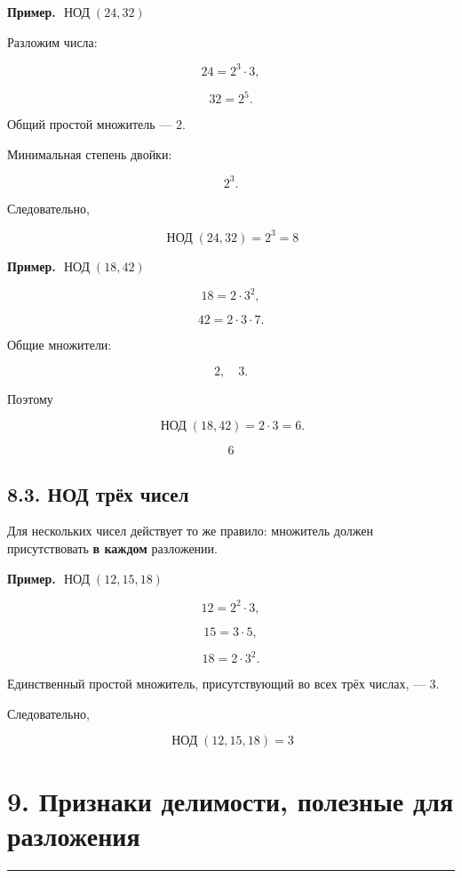 \documentclass[a4paper,12pt]{article}
\newcommand{\sectionline}{%
    \vspace{0.2em}
    {\color{accent}\rule{\linewidth}{0.6pt}}
    \vspace{0.5em}
}
\newcommand{\exampletitle}[1]{%
    \par\medskip
    {\color{accent}\textbf{Пример. #1}}
    \par\smallskip
}
\begin{document}
\exampletitle{\(\operatorname{НОД}(24,32)\)}

Разложим числа:

\[
24=2^3\cdot3,
\]

\[
32=2^5.
\]

Общий простой множитель --- \(2\).

Минимальная степень двойки:

\[
2^3.
\]

Следовательно,

\[
\boxed{
\operatorname{НОД}(24,32)=2^3=8
}
\]

\exampletitle{\(\operatorname{НОД}(18,42)\)}

\[
18=2\cdot3^2,
\]

\[
42=2\cdot3\cdot7.
\]

Общие множители:

\[
2,\quad3.
\]

Поэтому

\[
\operatorname{НОД}(18,42)
=
2\cdot3
=
6.
\]

\[
\boxed{6}
\]

\subsection*{\color{accent}8.3. НОД трёх чисел}

Для нескольких чисел действует то же правило:
множитель должен присутствовать \textbf{в каждом} разложении.

\exampletitle{\(\operatorname{НОД}(12,15,18)\)}

\[
12=2^2\cdot3,
\]

\[
15=3\cdot5,
\]

\[
18=2\cdot3^2.
\]

Единственный простой множитель, присутствующий во всех трёх числах, --- \(3\).

Следовательно,

\[
\boxed{
\operatorname{НОД}(12,15,18)=3
}
\]

\section*{\color{darkaccent}9. Признаки делимости, полезные для разложения}
\sectionline
\end{document}
